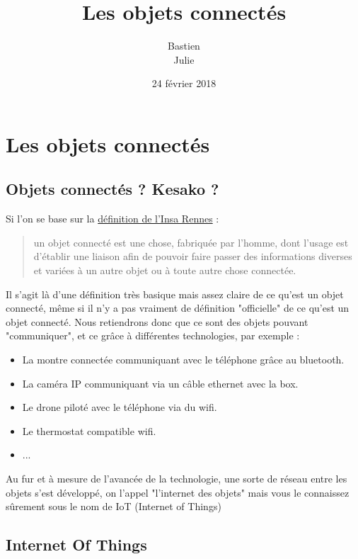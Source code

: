 \documentclass[a4paper]{report}
\title{Les objets connectés}
\author{Bastien \bsc{Labouche}\\Julie \bsc{Lopez}}
\date{24 février 2018}
\begin{document}
	
	\maketitle
	
	\tableofcontents
	
	\newpage
	
	\section{Les objets connectés}
	\subsection{Objets connectés ? Kesako ?}
	Si l'on se base sur la \href{http://objets.insa-rennes.fr/objets-connectes/quest-ce-quun-objet-connecte/}{définition de l'Insa Rennes} :
	\smallbreak
	\begin{quotation}
		un objet connecté est une chose, fabriquée par l’homme, dont l’usage est d’établir une liaison afin de pouvoir faire passer des 					informations diverses et variées à un autre objet ou à toute autre chose connectée.
	\end{quotation}
	\medbreak
	Il s'agit là d'une définition très basique mais assez claire de ce qu'est un objet connecté, même si il n'y a pas vraiment de définition
	"officielle" de ce qu'est un objet connecté. Nous retiendrons donc que ce sont des objets pouvant "communiquer", et ce grâce à différentes
	technologies, par exemple :
	
	\bigbreak
	
	\begin{itemize}
		\item La montre connectée communiquant avec le téléphone grâce au bluetooth.
		\item La caméra IP communiquant via un câble ethernet avec la box.
		\item Le drone piloté avec le téléphone via du wifi.
		\item Le thermostat compatible wifi.
		\item ...
	\end{itemize}

	\bigbreak
	
	Au fur et à mesure de l'avancée de la technologie, une sorte de réseau entre les objets s'est développé, on l'appel "l'internet des objets" 	mais vous le connaissez sûrement sous le nom de IoT (Internet of Things)
	
	\newpage
	
	\subsection{Internet Of Things}
	
\end{document}
